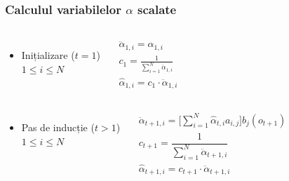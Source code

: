 \begin{frame}
  \frametitle{Calculul variabilelor $\alpha$ scalate}
  \begin{columns}%
    \begin{itemize}
    \item Inițializare ($t = 1$)\\\vspace*{1em}$1 \le i \le N$
    \end{itemize}%
    \begin{align}%
      \ddot{\alpha}_{1,i} = \alpha_{1,i}\\
      c_1 = \frac{1}{\displaystyle\sum_{i=1}^{N}
        \ddot{\alpha}_{1,i}} \\
      \hat{\alpha}_{1,i} = c_1 \cdot \ddot{\alpha}_{1,i}
    \end{align}%
  \end{columns}%
  \vspace*{.5em} \pause \horiline
  \begin{columns}
    \begin{itemize}
    \item Pas de inducție ($t > 1$)\\\vspace*{1em}$1 \le i \le N$
    \end{itemize}%
    \begin{align}%
      \ddot{\alpha}_{t+1,i} = \Big[
      \displaystyle\sum_{i=1}^{N}\hat{\alpha}_{t,i}a_{i,j}\Big]
      b_{j}(o_{t+1}) \\
      c_{t+1} = \dfrac{1}{\displaystyle\sum_{i=1}^{N}
        \ddot{\alpha}_{t+1,i}} \\
      \hat{\alpha}_{t+1,i} = c_{t+1} \cdot \ddot{\alpha}_{t+1,i}
    \end{align}%
  \end{columns}%
\end{frame}

